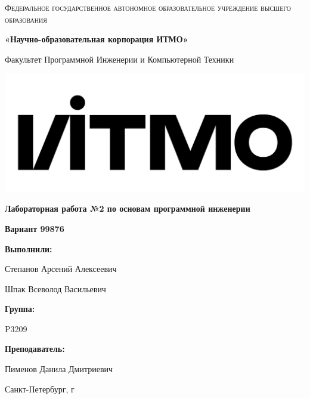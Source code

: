 \documentclass[12pt,a4paper]{article}
\begin{document}
\begin{titlepage} 
	\centering
	{
        \scshape
        Федеральное государственное автономное образовательное учреждение высшего образования
        \par
        \textbf{«Научно-образовательная корпорация ИТМО»}
        \par
        \vspace{1cm}
        Факультет Программной Инженерии и Компьютерной Техники
        \par
    }
    \vspace{0.6cm}
    \includegraphics[width=\textwidth]{logo.png}
    {
        \Large
        \textbf{Лабораторная работа №2 по основам программной инженерии}
        \par
        \normalsize
        \vspace{0.75cm}
        \textbf{Вариант 99876}
        \par
    }
    \vfill
    \hfill\begin{minipage}{\dimexpr\textwidth-7.8cm}
        \textbf{Выполнили:}\par
        Степанов Арсений Алексеевич\par
        Шпак Всеволод Васильевич\par
        \vspace{0.15cm}
        \textbf{Группа:}\par
        P3209\par
        \vspace{0.15cm}
        \textbf{Преподаватель:}\par
        Пименов Данила Дмитриевич\par
    \end{minipage}
    \vfill
    Санкт-Петербург, \the\year{}г
\end{titlepage}  
\end{document}
